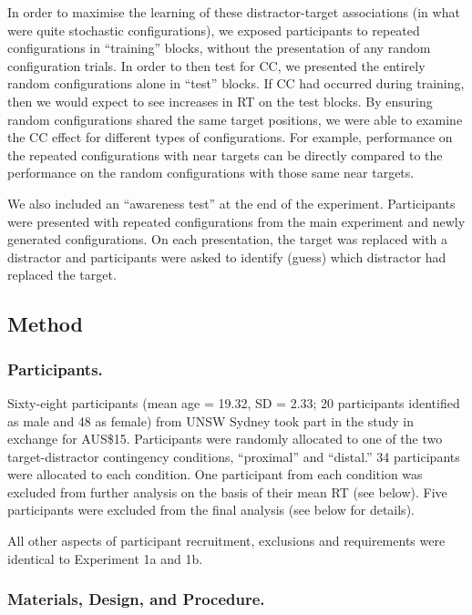 \documentclass[
  english,
  man,floatsintext]{apa7}
\begin{document}
In order to maximise the learning of these distractor-target associations (in what were quite stochastic configurations), we exposed participants to repeated configurations in ``training'' blocks, without the presentation of any random configuration trials. In order to then test for CC, we presented the entirely random configurations alone in ``test'' blocks. If CC had occurred during training, then we would expect to see increases in RT on the test blocks. By ensuring random configurations shared the same target positions, we were able to examine the CC effect for different types of configurations. For example, performance on the repeated configurations with near targets can be directly compared to the performance on the random configurations with those same near targets.

We also included an ``awareness test'' at the end of the experiment. Participants were presented with repeated configurations from the main experiment and newly generated configurations. On each presentation, the target was replaced with a distractor and participants were asked to identify (guess) which distractor had replaced the target.

\hypertarget{method-2}{%
\subsection{Method}\label{method-2}}

\hypertarget{participants.-2}{%
\subsubsection{Participants.}\label{participants.-2}}

Sixty-eight participants (mean age = 19.32, SD = 2.33; 20 participants identified as male and 48 as female) from UNSW Sydney took part in the study in exchange for AUS\$15. Participants were randomly allocated to one of the two target-distractor contingency conditions, ``proximal'' and ``distal.'' 34 participants were allocated to each condition. One participant from each condition was excluded from further analysis on the basis of their mean RT (see below). Five participants were excluded from the final analysis (see below for details).

All other aspects of participant recruitment, exclusions and requirements were identical to Experiment 1a and 1b.

\hypertarget{materials-design-and-procedure.-1}{%
\subsubsection{Materials, Design, and Procedure.}\label{materials-design-and-procedure.-1}}
\end{document}

